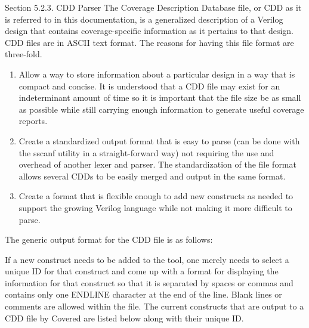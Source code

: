\begin{Desc}
\item[Section 5.2.3. CDD Parser]The Coverage Description Database file, or CDD as it is referred to in this documentation, is a generalized description of a Verilog design that contains coverage-specific information as it pertains to that design. CDD files are in ASCII text format. The reasons for having this file format are three-fold.\end{Desc}
\begin{Desc}
\item[]\begin{enumerate}
\item Allow a way to store information about a particular design in a way that is compact and concise. It is understood that a CDD file may exist for an indeterminant amount of time so it is important that the file size be as small as possible while still carrying enough information to generate useful coverage reports.\item Create a standardized output format that is easy to parse (can be done with the sscanf utility in a straight-forward way) not requiring the use and overhead of another lexer and parser. The standardization of the file format allows several CDDs to be easily merged and output in the same format.\item Create a format that is flexible enough to add new constructs as needed to support the growing Verilog language while not making it more difficult to parse.\end{enumerate}
\end{Desc}
\begin{Desc}
\item[]The generic output format for the CDD file is as follows:\end{Desc}
\begin{Desc}
\item[]{\tt }   {\tt }  \end{Desc}
\begin{Desc}
\item[]If a new construct needs to be added to the tool, one merely needs to select a unique ID for that construct and come up with a format for displaying the information for that construct so that it is separated by spaces or commas and contains only one ENDLINE character at the end of the line. Blank lines or comments are allowed within the file. The current constructs that are output to a CDD file by Covered are listed below along with their unique ID.\end{Desc}
